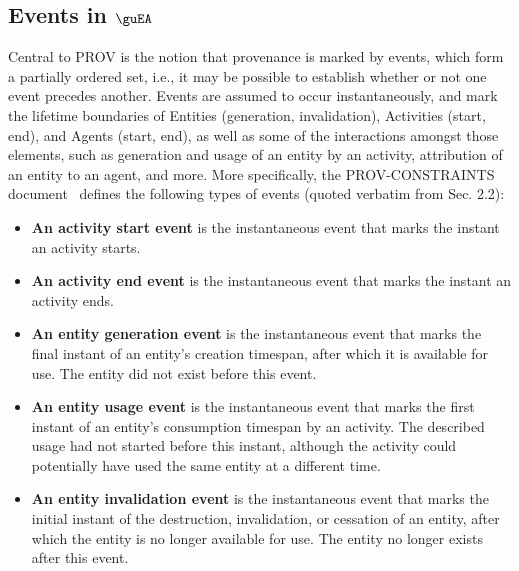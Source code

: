 \subsection{Events in $\guEA$}

\label{sec:events}

Central to PROV is the notion that provenance is marked by events, which form a partially ordered set, i.e., it may be possible to establish whether or not one event precedes another. 
%
Events are assumed to occur instantaneously, and mark the lifetime boundaries of Entities (generation, invalidation), Activities (start, end), and Agents (start, end), as well as some of the interactions amongst those elements, such as generation and usage of an entity by an activity, attribution of an entity to an agent, and more. More specifically, the PROV-CONSTRAINTS document~\cite{w3c-prov-constraints} defines the following types of events (quoted verbatim from Sec. 2.2):


\begin{itemize} %

\item\textbf{An activity start event} is the instantaneous event that marks the instant an activity starts.

\item\textbf{An activity end event} is the instantaneous event that marks the instant an activity ends.

\item\textbf{An entity generation event} is the instantaneous event that marks the final instant of an entity's creation timespan, after which it is available for use. The entity did not exist before this event.

\item\textbf{An entity usage event}  is the instantaneous event that marks the first instant of an entity's consumption timespan by an activity. The described usage had not started before this instant, although the activity could potentially have used the same entity at a different time.

\item\textbf{An entity invalidation event} is the instantaneous event that marks the initial instant of the destruction, invalidation, or cessation of an entity, after which the entity is no longer available for use. The entity no longer exists after this event.

\end{itemize}


